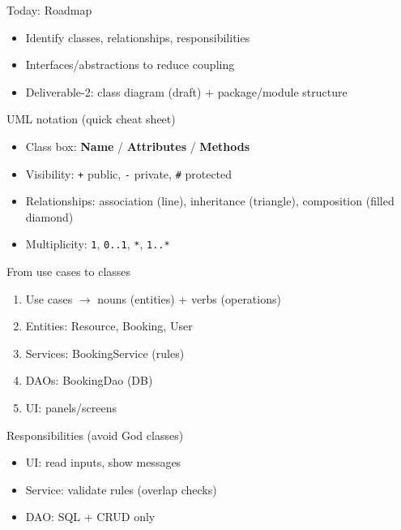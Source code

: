\documentclass{beamer}
\begin{document}
\begin{frame}{Today: Roadmap}
  \begin{itemize}[<+->]
    \item Identify classes, relationships, responsibilities
    \item Interfaces/abstractions to reduce coupling
    \item Deliverable-2: class diagram (draft) + package/module structure
  \end{itemize}
  \slidesources{\OOPSUnitVISources}
\end{frame}

\begin{frame}{UML notation (quick cheat sheet)}
  \begin{itemize}[<+->]
    \item Class box: \textbf{Name} / \textbf{Attributes} / \textbf{Methods}
    \item Visibility: \texttt{+} public,\; \texttt{-} private,\; \texttt{\#} protected
    \item Relationships: association (line), inheritance (triangle), composition (filled diamond)
    \item Multiplicity: \texttt{1}, \texttt{0..1}, \texttt{*}, \texttt{1..*}
  \end{itemize}
  \slidesources{\OOPSUnitVISources}
\end{frame}

\begin{frame}{From use cases to classes}
  \begin{enumerate}[<+->]
    \item Use cases $\rightarrow$ nouns (entities) + verbs (operations)
    \item Entities: Resource, Booking, User
    \item Services: BookingService (rules)
    \item DAOs: BookingDao (DB)
    \item UI: panels/screens
  \end{enumerate}
  \slidesources{\OOPSUnitVISources}
\end{frame}

\begin{frame}{Responsibilities (avoid God classes)}
  \begin{itemize}[<+->]
    \item UI: read inputs, show messages
    \item Service: validate rules (overlap checks)
    \item DAO: SQL + CRUD only
  \end{itemize}
  \slidesources{\OOPSUnitVISources}
\end{frame}
\end{document}
